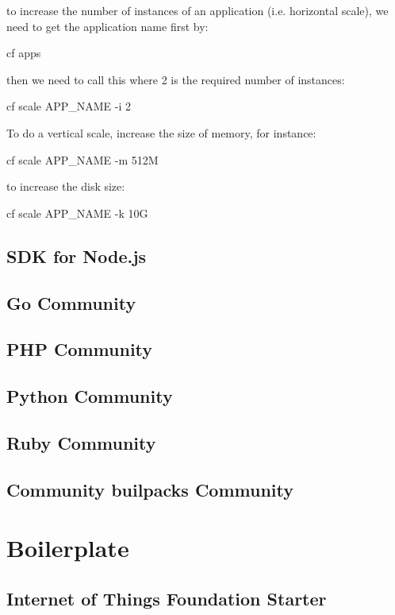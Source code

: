 \documentclass[]{book}
\begin{document}
to increase the number of instances of an application (i.e. horizontal scale), we need to get the application name first by: 
\begin{code}
cf apps
\end{code}

then we need to call this where 2 is the required number of instances: 
\begin{code}
cf scale APP_NAME -i 2
\end{code}

To do a vertical scale, increase the size of memory, for instance: 
\begin{code}
cf scale APP_NAME -m 512M
\end{code}

to increase the disk size:
\begin{code}
cf scale APP_NAME -k 10G
\end{code}


\section{SDK for Node.js}
\section{Go Community}
\section{PHP Community}
\section{Python Community}
\section{Ruby Community}
\section{Community builpacks Community}

\chapter{Boilerplate}
\label{sec:Boilerplate}

\section{Internet of Things Foundation Starter}
\label{sec:InternetofThingsFoundationStarter}
\end{document}
